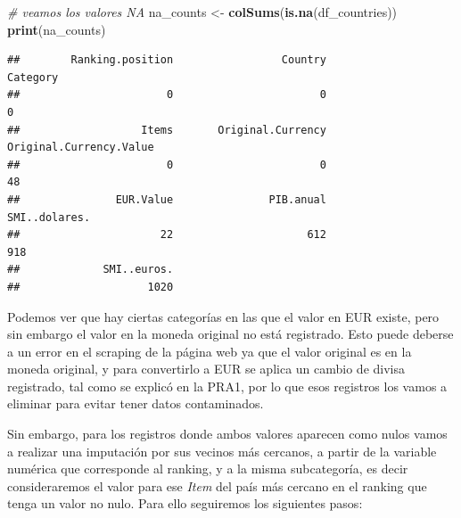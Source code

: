 \documentclass[
]{article}
\newenvironment{Shaded}{\begin{snugshade}}{\end{snugshade}}
\newcommand{\CommentTok}[1]{\textcolor[rgb]{0.56,0.35,0.01}{\textit{#1}}}
\newcommand{\FunctionTok}[1]{\textcolor[rgb]{0.13,0.29,0.53}{\textbf{#1}}}
\newcommand{\NormalTok}[1]{#1}
\newcommand{\OtherTok}[1]{\textcolor[rgb]{0.56,0.35,0.01}{#1}}
\newcommand{\SpecialCharTok}[1]{\textcolor[rgb]{0.81,0.36,0.00}{\textbf{#1}}}
\begin{document}
\begin{Shaded}
\begin{Highlighting}[]
\CommentTok{\# veamos los valores NA}
\NormalTok{na\_counts }\OtherTok{\textless{}{-}} \FunctionTok{colSums}\NormalTok{(}\FunctionTok{is.na}\NormalTok{(df\_countries))}
\FunctionTok{print}\NormalTok{(na\_counts)}
\end{Highlighting}
\end{Shaded}

\begin{verbatim}
##        Ranking.position                 Country                Category 
##                       0                       0                       0 
##                   Items       Original.Currency Original.Currency.Value 
##                       0                       0                      48 
##               EUR.Value               PIB.anual           SMI..dolares. 
##                      22                     612                     918 
##             SMI..euros. 
##                    1020
\end{verbatim}

Podemos ver que hay ciertas categorías en las que el valor en EUR
existe, pero sin embargo el valor en la moneda original no está
registrado. Esto puede deberse a un error en el scraping de la página
web ya que el valor original es en la moneda original, y para
convertirlo a EUR se aplica un cambio de divisa registrado, tal como se
explicó en la PRA1, por lo que esos registros los vamos a eliminar para
evitar tener datos contaminados.

\begin{Shaded}
\end{Shaded}

Sin embargo, para los registros donde ambos valores aparecen como nulos
vamos a realizar una imputación por sus vecinos más cercanos, a partir
de la variable numérica que corresponde al ranking, y a la misma
subcategoría, es decir consideraremos el valor para ese \emph{Item} del
país más cercano en el ranking que tenga un valor no nulo. Para ello
seguiremos los siguientes pasos:
\end{document}
